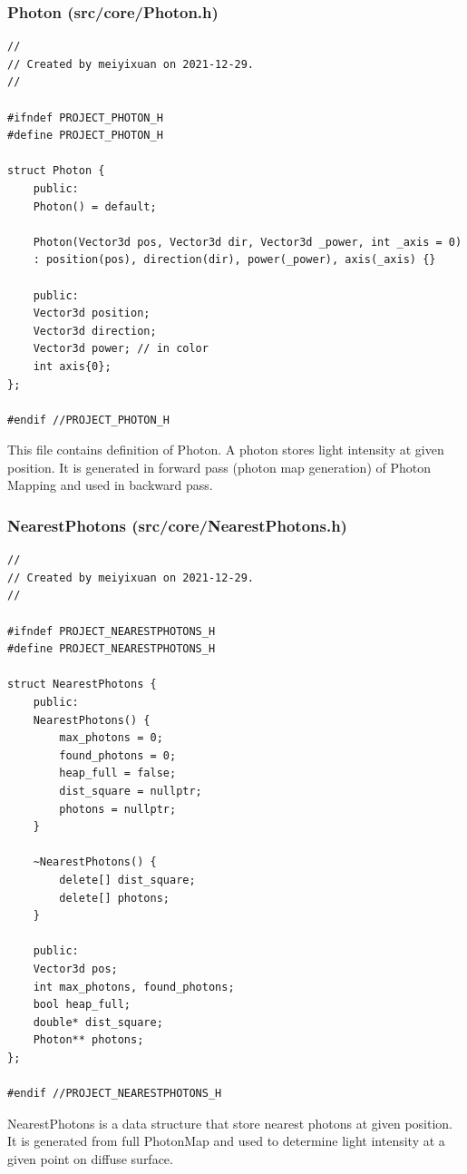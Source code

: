\documentclass[utf8]{article}
\begin{document}
\subsubsection{Photon (src/core/Photon.h)}
\begin{lstlisting}[style=CStyle]
//
// Created by meiyixuan on 2021-12-29.
//

#ifndef PROJECT_PHOTON_H
#define PROJECT_PHOTON_H

struct Photon {
	public:
	Photon() = default;
	
	Photon(Vector3d pos, Vector3d dir, Vector3d _power, int _axis = 0)
	: position(pos), direction(dir), power(_power), axis(_axis) {}
	
	public:
	Vector3d position;
	Vector3d direction;
	Vector3d power; // in color
	int axis{0};
};

#endif //PROJECT_PHOTON_H

\end{lstlisting}
This file contains definition of Photon. A photon stores light intensity at given position. It is generated in forward pass (photon map generation) of Photon Mapping and used in backward pass.

\subsubsection{NearestPhotons (src/core/NearestPhotons.h)}
\begin{lstlisting}[style=CStyle]
//
// Created by meiyixuan on 2021-12-29.
//

#ifndef PROJECT_NEARESTPHOTONS_H
#define PROJECT_NEARESTPHOTONS_H

struct NearestPhotons {
	public:
	NearestPhotons() {
		max_photons = 0;
		found_photons = 0;
		heap_full = false;
		dist_square = nullptr;
		photons = nullptr;
	}
	
	~NearestPhotons() {
		delete[] dist_square;
		delete[] photons;
	}
	
	public:
	Vector3d pos;
	int max_photons, found_photons;
	bool heap_full;
	double* dist_square;
	Photon** photons;
};

#endif //PROJECT_NEARESTPHOTONS_H

\end{lstlisting}
NearestPhotons is a data structure that store nearest photons at given position. It is generated from full PhotonMap and used to determine light intensity at a given point on diffuse surface. 
\end{document}

